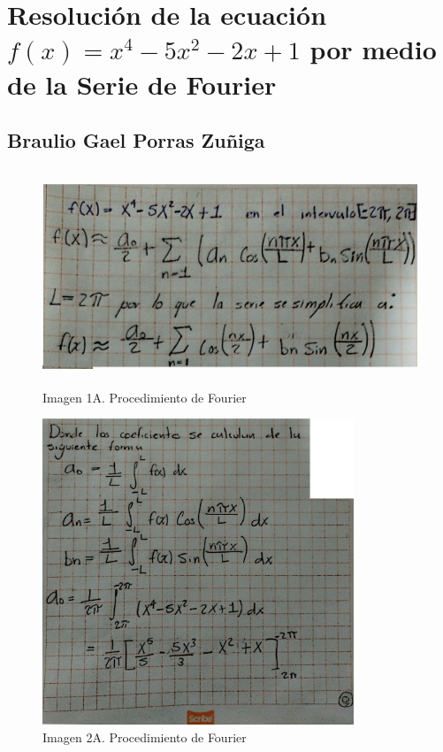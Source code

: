 \section{\texorpdfstring{Resolución de la ecuación \(f(x) = x^4 - 5x^2 - 2x + 1\) por medio de la Serie de Fourier}{Resolución de la ecuación f(x) = x\string^4 - 5x\string^2 - 2x + 1 por medio de la Serie de Fourier}}
\subsection{Braulio Gael Porras Zuñiga}

\begin{figure}[H]
	\centering
	\includegraphics[width=5.15104in,height=2.54129in]{media/image52.png}
	\caption{Imagen 1A. Procedimiento de Fourier}
\end{figure}

\begin{figure}[H]
	\centering
	\includegraphics[width=3.66667in,height=3.60643in]{media/image49.png}
	\caption{Imagen 2A. Procedimiento de Fourier}
\end{figure}

